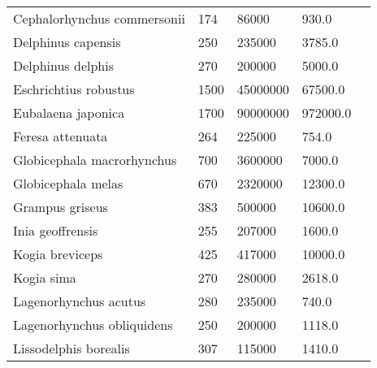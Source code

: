 \begin{longtable}{|p{2.1in}p{0.5in}p{1.0in}p{1.0in}p{1.5in}|}
 Cephalorhynchus commersonii  &          174 &       86000  &        930.0   &                                  \citet{goodall1994} \\
          Delphinus capensis  &          250 &      235000  &       3785.0   &                       \citet{jefferson2008,ross1979} \\
           Delphinus delphis  &          270 &      200000  &       5000.0   &                                \citet{jefferson2008} \\
       Eschrichtius robustus  &         1500 &    45000000  &      67500.0   &                                  \citet{tomilin1967} \\
         Eubalaena japonica   &         1700 &    90000000  &     972000.0   &                                     \citet{best2001} \\
            Feresa attenuata  &          264 &      225000  &        754.0   &                                \citet{jefferson2008} \\
  Globicephala macrorhynchus  &          700 &     3600000  &       7000.0   &                                \citet{jefferson2008} \\
          Globicephala melas  &          670 &     2320000  &      12300.0   &                  \citet{jefferson2008,desportes1993} \\
             Grampus griseus  &          383 &      500000  &      10600.0   &                     \citet{jefferson2008,perrin1984} \\
            Inia geoffrensis  &          255 &      207000  &       1600.0   &                       \citet{jefferson2008,best1989} \\
             Kogia breviceps  &          425 &      417000  &      10000.0   &   \citet{bloodworth2008,caldwell1971,tomilin1967,ruiz1993} \\
                  Kogia sima  &          270 &      280000  &       2618.0   &                                     \citet{ross1979} \\
       Lagenorhynchus acutus  &          280 &      235000  &        740.0   &                                \citet{jefferson2008} \\
  Lagenorhynchus obliquidens  &          250 &      200000  &       1118.0   &                                 \citet{harrison1972} \\
       Lissodelphis borealis  &          307 &      115000  &       1410.0   &                                 \citet{harrison1972} \\

\end{longtable}
